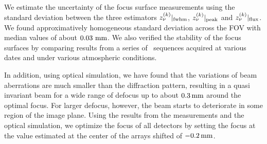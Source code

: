 We estimate the uncertainty of the focus
surface measurements using the standard deviation between the three
estimators $z_\nu^{(k)}|_{\rm{fwhm}}$, $z_\nu^{(k)}|_{\rm{peak}}$ and
$z_\nu^{(k)}|_{\rm{flux}}$. We found approximatively homogeneous
standard deviation across the FOV with median values of about
$0.03~\rm{mm}$. We also verified the stability of the focus surfaces by comparing
results from a series of \bm\ sequences acquired at various dates and
under various atmospheric conditions.

{\lp In addition, using optical simulation, we have found that the
variations of beam aberrations are much smaller than the
diffraction pattern, resulting in a quasi invariant beam for a
wide range of defocus up to about $0.3\, \rm{mm}$ around the optimal
focus. For larger defocus, however, the beam starts to deteriorate in
some region of the image plane.}
{\lp Using the results from the measurements and the optical
simulation, we optimize the focus of all detectors by setting the
focus at the value estimated at the center of the arrays shifted of
$-0.2\,\rm{mm}$.}





